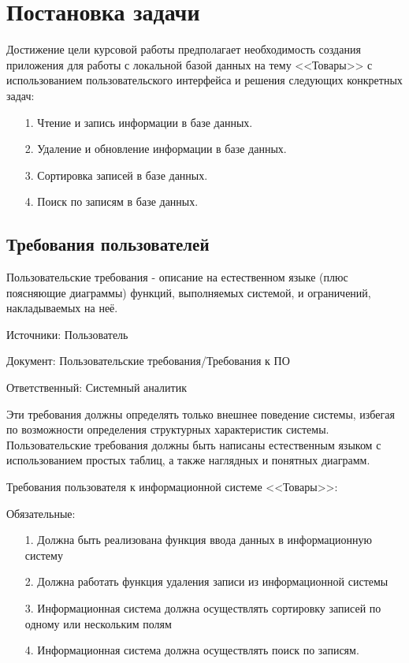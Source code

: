 \section{Постановка задачи}

Достижение цели курсовой работы предполагает необходимость создания приложения для работы с локальной базой данных на тему <<Товары>> с использованием пользовательского интерфейса и решения следующих конкретных задач:

\begin{enumerate}
    \item [1.] Чтение и запись информации в базе данных.
    \item [2.] Удаление и обновление информации в базе данных.
    \item [3.] Сортировка записей в базе данных.
    \item [4.] Поиск по записям в базе данных.
\end{enumerate}

\subsection{Требования пользователей}

Пользовательские требования - описание на естественном языке (плюс поясняющие диаграммы) функций, выполняемых системой, и ограничений, накладываемых на неё.

Источники: Пользователь

Документ: Пользовательские требования/Требования к ПО

Ответственный: Системный аналитик

Эти требования должны определять только внешнее поведение системы, избегая по возможности определения структурных характеристик системы. Пользовательские требования должны быть написаны естественным языком с использованием простых таблиц, а также наглядных и понятных диаграмм.

Требования пользователя к информационной системе <<Товары>>:

Обязательные:

\begin{enumerate}
    \item [1.] Должна быть реализована функция ввода данных в информационную систему
    \item [2.] Должна работать функция удаления записи из информационной системы
    \item [3.] Информационная система должна осуществлять сортировку записей по одному или нескольким полям
    \item [4.] Информационная система должна осуществлять поиск по записям.
\end{enumerate}

